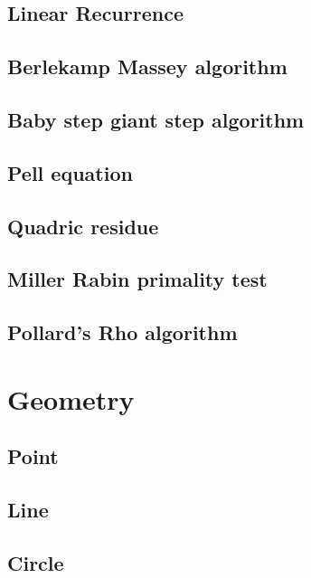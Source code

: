 \documentclass[titlepage, a4paper,10pt]{article}
\begin{document}
\begin{multicols}{2}
\begin{spacing}{0.6}
{			\subsection{Linear Recurrence}
				
			\subsection{Berlekamp Massey algorithm}
				
			\subsection{Baby step giant step algorithm}
				
			\subsection{Pell equation}
				
			\subsection{Quadric residue}
				
			\subsection{Miller Rabin primality test}
				
			\subsection{Pollard's Rho algorithm}
				
		\section{Geometry}
				
			\subsection{Point}
				
			\subsection{Line}
				
			\subsection{Circle}
				
}
\end{spacing}
\end{multicols}
\end{document}
